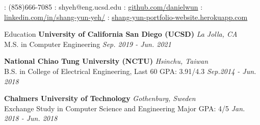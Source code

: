 \documentclass{resume} %
\begin{document}
{\faPhone: (858)666-7085}
{\faEnvelope: shyeh@eng.ucsd.edu}
{  \faGithub: \href{https://github.com/danielwun}{github.com/danielwun}}
{  \faLinkedin: \href{https://www.linkedin.com/in/shang-yun-yeh/}{linkedin.com/in/shang-yun-yeh/}}
{ \faHome: \href{https://shang-yun-portfolio-website.herokuapp.com/}{shang-yun-portfolio-website.herokuapp.com}}



\begin{rSection}{Education}
{\bf University of California San Diego (UCSD)} \hfill {\em La Jolla, CA} 
\\ {M.S. in Computer Engineering \hfill {\em Sep. 2019 - Jun. 2021}}
\par
{\bf National Chiao Tung University (NCTU)} \hfill {\em Hsinchu, Taiwan} 
\\ {B.S. in College of Electrical Engineering, Last 60 GPA: 3.91/4.3 \hfill {\em Sep.2014 - Jun. 2018}}
\par
{\bf Chalmers University of Technology} \hfill {\em Gothenburg, Sweden} 
\\ {Exchange Study in Computer Science and Engineering Major GPA: 4/5 }
\hfill {\em Jan. 2018 - Jun. 2018} 
\par

\end{rSection}

\end{document}
